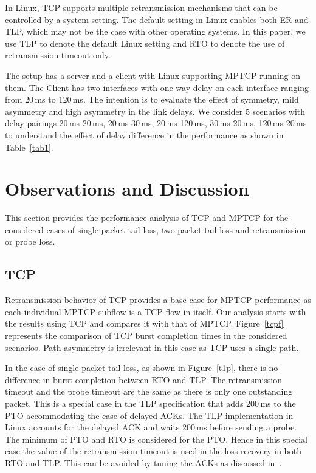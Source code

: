 \documentclass[10pt,conference]{IEEEtran}
\begin{document}
In Linux, TCP supports multiple retransmission mechanisms that can be controlled by a system setting. The default setting in Linux enables both
ER and TLP, which may not be the case with other operating systems. In this paper, we use TLP to denote the default Linux setting and RTO to denote
the use of retransmission timeout only.


The setup has a server and a client with Linux supporting MPTCP running on them. The Client has two interfaces with one way delay on each interface 
ranging from 20\,ms to 120\,ms. The intention is to evaluate the effect of symmetry, mild asymmetry and high asymmetry in the link delays. We 
consider 5 scenarios with delay pairings 20\,ms-20\,ms, 20\,ms-30\,ms, 20\,ms-120\,ms, 30\,ms-20\,ms, 120\,ms-20\,ms to understand the effect of
delay difference in the performance as shown in Table~\ref{tab1}.


\section{Observations and Discussion}\label{disc}
This section provides the performance analysis of TCP and MPTCP for the considered cases of single packet tail loss, two packet tail loss and 
retransmission or probe loss.
\subsection{TCP}
Retransmission behavior of TCP provides a base case for MPTCP performance as each individual MPTCP subflow is a TCP flow in itself. Our analysis
starts with the results using TCP and compares it with that of MPTCP. Figure~\ref{tcpf} represents the comparison of TCP burst completion times
in the considered scenarios. Path
asymmetry is irrelevant in this case as TCP uses a single path.

In the case of single packet tail loss, as shown in Figure~\ref{t1p}, there is no difference in burst completion between RTO and TLP. The 
retransmission timeout and the probe timeout are the same as there is only one outstanding packet. This is a special case in the TLP
specification that adds 200\,ms to the PTO accommodating the case of delayed ACKs. The TLP implementation in Linux accounts for the delayed 
ACK and waits 200\,ms before sending a probe. The minimum of PTO and RTO is considered for the PTO. Hence in this special case the value of 
the retransmission timeout is used in the loss recovery in both RTO and TLP. This can be avoided by tuning the ACKs as discussed 
in~\cite{Rajiullah:2015}.
\end{document}
